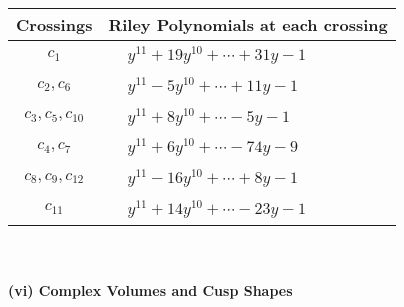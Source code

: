 \documentclass[1p]{elsarticle_modified}
\theoremstyle{definition}
\begin{document}
\begin{tabular}{m{50pt}|m{274pt}}
Crossings & \hspace{64pt}Riley Polynomials at each crossing \\
\hline $$\begin{aligned}c_{1}\end{aligned}$$&$\begin{aligned}
&y^{11}+19 y^{10}+\cdots+31 y-1
\end{aligned}$\\
\hline $$\begin{aligned}c_{2},c_{6}\end{aligned}$$&$\begin{aligned}
&y^{11}-5 y^{10}+\cdots+11 y-1
\end{aligned}$\\
\hline $$\begin{aligned}c_{3},c_{5},c_{10}\end{aligned}$$&$\begin{aligned}
&y^{11}+8 y^{10}+\cdots-5 y-1
\end{aligned}$\\
\hline $$\begin{aligned}c_{4},c_{7}\end{aligned}$$&$\begin{aligned}
&y^{11}+6 y^{10}+\cdots-74 y-9
\end{aligned}$\\
\hline $$\begin{aligned}c_{8},c_{9},c_{12}\end{aligned}$$&$\begin{aligned}
&y^{11}-16 y^{10}+\cdots+8 y-1
\end{aligned}$\\
\hline $$\begin{aligned}c_{11}\end{aligned}$$&$\begin{aligned}
&y^{11}+14 y^{10}+\cdots-23 y-1
\end{aligned}$\\
\hline
\end{tabular}\\~\\
\newpage\flushleft \textbf{(vi) Complex Volumes and Cusp Shapes}
\end{document}
